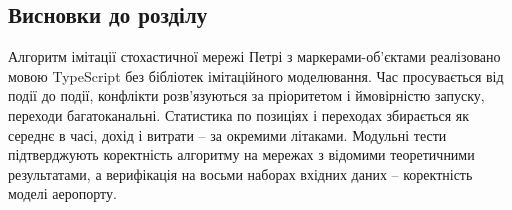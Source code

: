 \subsection{Висновки до розділу}

Алгоритм імітації стохастичної мережі Петрі з маркерами-об'єктами реалізовано мовою TypeScript без бібліотек імітаційного моделювання. Час просувається від події до події, конфлікти розв'язуються за пріоритетом і ймовірністю запуску, переходи багатоканальні. Статистика по позиціях і переходах збирається як середнє в часі, дохід і витрати -- за окремими літаками. Модульні тести підтверджують коректність алгоритму на мережах з відомими теоретичними результатами, а верифікація на восьми наборах вхідних даних -- коректність моделі аеропорту.

